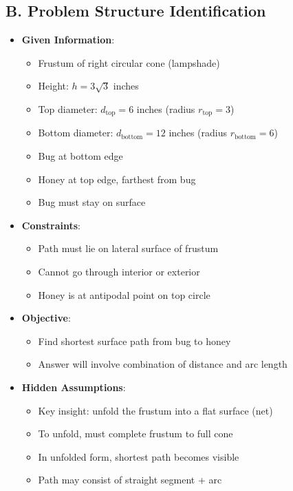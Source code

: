 \documentclass[12pt]{article}
\begin{document}
\begin{problemconfigbox}
\subsection*{B. Problem Structure Identification}
\begin{itemize}[leftmargin=*]
    \item \textbf{Given Information}: 
    \begin{itemize}
        \item Frustum of right circular cone (lampshade)
        \item Height: $h = 3\sqrt{3}$ inches
        \item Top diameter: $d_{\text{top}} = 6$ inches (radius $r_{\text{top}} = 3$)
        \item Bottom diameter: $d_{\text{bottom}} = 12$ inches (radius $r_{\text{bottom}} = 6$)
        \item Bug at bottom edge
        \item Honey at top edge, farthest from bug
        \item Bug must stay on surface
    \end{itemize}
    \item \textbf{Constraints}: 
    \begin{itemize}
        \item Path must lie on lateral surface of frustum
        \item Cannot go through interior or exterior
        \item Honey is at antipodal point on top circle
    \end{itemize}
    \item \textbf{Objective}: 
    \begin{itemize}
        \item Find shortest surface path from bug to honey
        \item Answer will involve combination of distance and arc length
    \end{itemize}
    \item \textbf{Hidden Assumptions}: 
    \begin{itemize}
        \item Key insight: unfold the frustum into a flat surface (net)
        \item To unfold, must complete frustum to full cone
        \item In unfolded form, shortest path becomes visible
        \item Path may consist of straight segment + arc
    \end{itemize}

\end{itemize}
\end{problemconfigbox}
\end{document}
